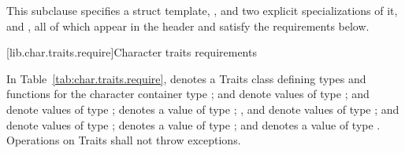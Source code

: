 \pnum
This subclause specifies a struct template,
,
and two explicit specializations of it,
and
,
all of which appear in the header
and satisfy the requirements below.

[lib.char.traits.require]{Character traits requirements}

\pnum
In Table~\ref{tab:char.traits.require},
denotes a Traits class defining types and functions for the
character container type
;
and
denote values of type
;
and
denote values of type
;
denotes a value of type
;
,
and
denote values of type
;
and
denote values of type
;
denotes a value of type
;
and
denotes a value of type
.
Operations on Traits shall not throw exceptions.


